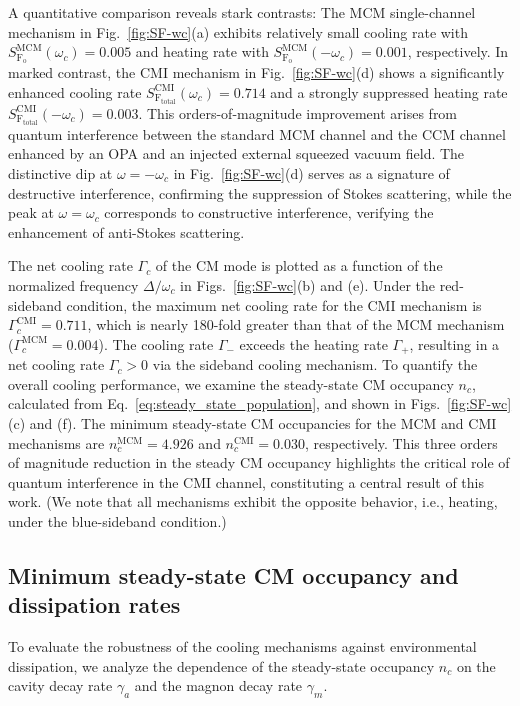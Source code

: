 \documentclass[aps, prresearch, reprint, nofootinbib, longbibliography]{revtex4-2}
\begin{document}
A quantitative comparison reveals stark contrasts: The MCM single-channel mechanism in Fig.~\ref{fig:SF-wc}(a) exhibits relatively small cooling rate with $S_{\mathrm{F_o}}^{\mathrm{MCM}}(\omega_c) = 0.005$ and heating rate with $S_{\mathrm{F_o}}^{\mathrm{MCM}}(-\omega_c) = 0.001$, respectively. 
In marked contrast, the CMI mechanism in Fig.~\ref{fig:SF-wc}(d) shows a significantly enhanced cooling rate $S_{\mathrm{F_{total}}}^{\mathrm{CMI}}(\omega_c) = 0.714$ and a strongly suppressed heating rate  $S_{\mathrm{F_{total}}}^{\mathrm{CMI}}(-\omega_c) = 0.003$.
This orders-of-magnitude improvement arises from quantum interference between the standard MCM channel and the CCM channel enhanced by an OPA and an injected external squeezed vacuum field.
The distinctive dip at $\omega = -\omega_c$ in Fig.~\ref{fig:SF-wc}(d) serves as a signature of destructive interference, confirming the suppression of Stokes scattering, while the peak at $\omega = \omega_c$ corresponds to constructive interference, verifying the enhancement of anti-Stokes scattering.

The net cooling rate $\Gamma_c$ of the CM mode is plotted as a function of the normalized frequency $\Delta/\omega_c$ in Figs.~\ref{fig:SF-wc}(b) and (e). 
Under the red-sideband condition, the maximum net cooling rate for the CMI mechanism is $\Gamma_c^{\mathrm{CMI}} = 0.711$, which is nearly 180-fold greater than that of the MCM mechanism ($\Gamma_c^{\mathrm{MCM}} = 0.004$).
The cooling rate $\Gamma_-$ exceeds the heating rate $\Gamma_+$, resulting in a net cooling rate $\Gamma_c > 0$ via the sideband cooling mechanism\cite{PhysRevLett.110.153606, PhysRevLett.123.153601,PhysRevLett.117.173602}. 
To quantify the overall cooling performance, we examine the steady-state CM occupancy $n_c$, calculated from Eq.~\eqref{eq:steady_state_population}, and shown in Figs.~\ref{fig:SF-wc}(c) and (f). The minimum steady-state CM occupancies for the MCM and CMI mechanisms are $n_c^{\mathrm{MCM}} = 4.926$ and $n_c^{\mathrm{CMI}} = 0.030$, respectively. This three orders of magnitude reduction in the steady CM occupancy highlights the critical role of quantum interference in the CMI channel, constituting a central result of this work. (We note that all mechanisms exhibit the opposite behavior, i.e., heating, under the blue-sideband condition.)

\subsection{ Minimum steady-state CM occupancy and dissipation rates}
To evaluate the robustness of the cooling mechanisms against environmental dissipation, we analyze the dependence of the steady-state occupancy \( n_c \) on the cavity decay rate \( \gamma_a \) and the magnon decay rate  \( \gamma_m \).
\end{document}
